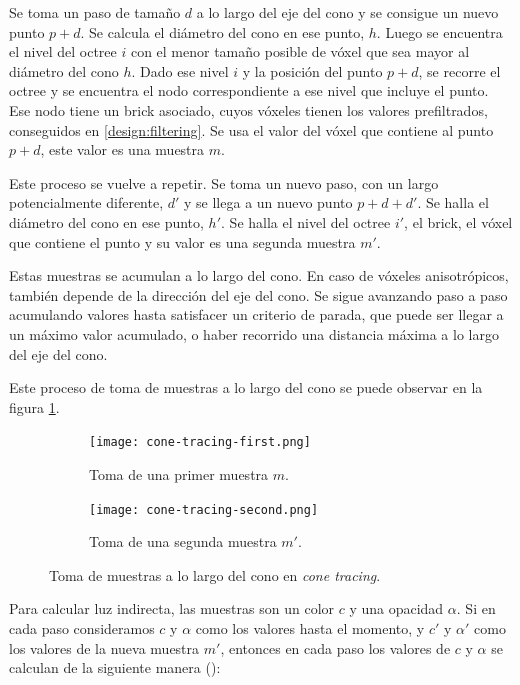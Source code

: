 Se toma un paso de tamaño $d$ a lo largo del eje del cono y se consigue un nuevo punto $p + d$.
Se calcula el diámetro del cono en ese punto, $h$.
Luego se encuentra el nivel del octree $i$ con el menor tamaño posible de vóxel que sea mayor al diámetro del cono $h$.
Dado ese nivel $i$ y la posición del punto $p + d$, se recorre el octree y se encuentra el nodo correspondiente a ese nivel que incluye el punto.
Ese nodo tiene un brick asociado, cuyos vóxeles tienen los valores prefiltrados, conseguidos en \ref{design:filtering}.
Se usa el valor del vóxel que contiene al punto $p + d$, este valor es una muestra $m$.

Este proceso se vuelve a repetir.
Se toma un nuevo paso, con un largo potencialmente diferente, $d'$ y se llega a un nuevo punto $p + d + d'$.
Se halla el diámetro del cono en ese punto, $h'$.
Se halla el nivel del octree $i'$, el brick, el vóxel que contiene el punto y su valor es una segunda muestra $m'$.

Estas muestras se acumulan a lo largo del cono.
En caso de vóxeles anisotrópicos, también depende de la dirección del eje del cono.
Se sigue avanzando paso a paso acumulando valores hasta satisfacer un criterio de parada,
que puede ser llegar a un máximo valor acumulado, o haber recorrido una distancia máxima a lo largo del eje del cono.

Este proceso de toma de muestras a lo largo del cono se puede observar en la figura \ref{fig:cone-tracing-sampling}.

\begin{figure}
    \begin{subfigure}{.49\textwidth}
        \centering
        \texttt{[image: cone-tracing-first.png]}
        \caption{Toma de una primer muestra $m$.}
    \end{subfigure}
    \begin{subfigure}{.49\textwidth}
        \centering
        \texttt{[image: cone-tracing-second.png]}
        \caption{Toma de una segunda muestra $m'$.}
    \end{subfigure}
    \caption{Toma de muestras a lo largo del cono en \textit{cone tracing}.}
    \label{fig:cone-tracing-sampling}
\end{figure}

Para calcular luz indirecta, las muestras son un color $c$ y una opacidad $\alpha$.
Si en cada paso consideramos $c$ y $\alpha$ como los valores hasta el momento, y $c'$ y $\alpha'$ como los valores de la nueva muestra $m'$, entonces en cada paso los valores de $c$ y $\alpha$ se calculan de la siguiente manera (\cite{voxel-cone-tracing}):

